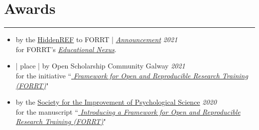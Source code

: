 \documentclass[letterpaper]{article}
\begin{document}
\section*{\color{Brown} Awards}
\vspace{-0.5em}
\hrule
\vspace{1em}
\begin{itemize}

\item[]{ by the \href{https://hidden-ref.org/about/}{\color{BlueViolet}HiddenREF} to FORRT  | \href{https://youtu.be/btjRNG0NANg?t=1070}{\color{BlueViolet} \it Announcement} \hfill{\em 2021} \\ for FORRT's {\href{https://forrt.org/nexus}{\color{BlueViolet} \it Educational Nexus}}.}


\item[]{ |  place | by Open Scholarship Community Galway  \hfill{\em 2021} \\ for the initiative ``{\href{http://forrt.org/}{\color{BlueViolet} \it Framework for Open and Reproducible Research Training (FORRT)}}" \hfill{\em{}}
}

\item[]{ by the \href{http://improvingpsych.org/mission/awards/}{\color{BlueViolet}Society for the Improvement of Psychological Science} \hfill{\em 2020} \\ for the manuscript ``{\href{https://osf.io/bnh7p}{\color{BlueViolet} \it Introducing a Framework for Open and Reproducible Research Training (FORRT)}}"}

\end{itemize}



\end{document}
